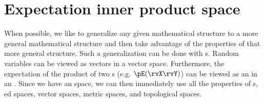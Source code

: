 \section{Expectation inner product space}
When possible, we like to generalize any given mathematical structure
to a more general mathematical structure and then take advantage of
the properties of that more general structure.
Such a generalization can be done with s.
Random variables can be viewed as vectors in a vector space.
Furthermore, the expectation of the product of two s
(e.g. $\pE(\rvX\rvY)$)
can be viewed as an  in an .
Since we have an  space,
we can then immediately use all the properties of
s, ed spaces, vector spaces, metric spaces,
and topological spaces.

